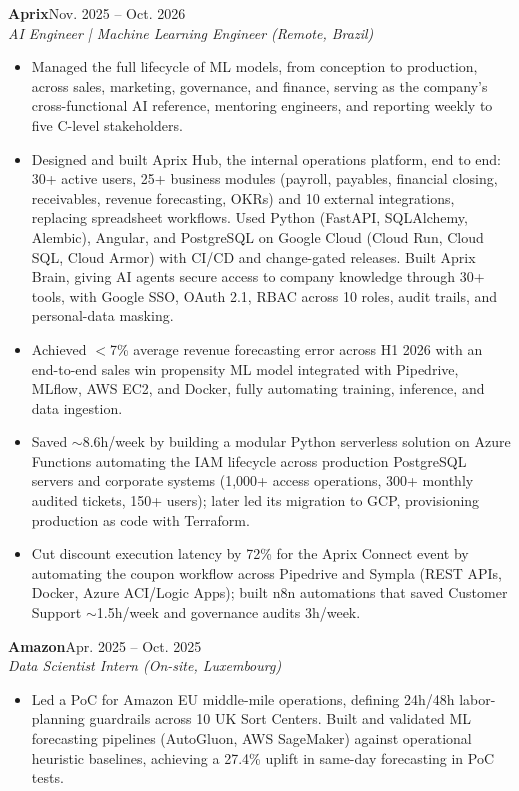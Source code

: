 \documentclass[10pt,letterpaper]{article}
\newcommand{\entry}[4]{%
  \textbf{#1}\hfill #2\\[-1pt]
  \textit{#3}\hfill #4\par\vspace{1pt}}
\newenvironment{bul}{\begin{itemize}[leftmargin=1.5em,label=--,itemsep=0pt,topsep=1pt,parsep=0pt]}{\end{itemize}}
\begin{document}
\entry{Aprix}{Nov. 2025 -- Oct. 2026}{AI Engineer | Machine Learning Engineer (Remote, Brazil)}{}
\begin{bul}
\item Managed the full lifecycle of ML models, from conception to production, across sales, marketing, governance, and finance, serving as the company's cross-functional AI reference, mentoring engineers, and reporting weekly to five C-level stakeholders.
\item Designed and built Aprix Hub, the internal operations platform, end to end: 30+ active users, 25+ business modules (payroll, payables, financial closing, receivables, revenue forecasting, OKRs) and 10 external integrations, replacing spreadsheet workflows. Used Python (FastAPI, SQLAlchemy, Alembic), Angular, and PostgreSQL on Google Cloud (Cloud Run, Cloud SQL, Cloud Armor) with CI/CD and change-gated releases. Built Aprix Brain, giving AI agents secure access to company knowledge through 30+ tools, with Google SSO, OAuth 2.1, RBAC across 10 roles, audit trails, and personal-data masking.
\item Achieved $<$7\% average revenue forecasting error across H1 2026 with an end-to-end sales win propensity ML model integrated with Pipedrive, MLflow, AWS EC2, and Docker, fully automating training, inference, and data ingestion.
\item Saved $\sim$8.6h/week by building a modular Python serverless solution on Azure Functions automating the IAM lifecycle across production PostgreSQL servers and corporate systems (1,000+ access operations, 300+ monthly audited tickets, 150+ users); later led its migration to GCP, provisioning production as code with Terraform.
\item Cut discount execution latency by 72\% for the Aprix Connect event by automating the coupon workflow across Pipedrive and Sympla (REST APIs, Docker, Azure ACI/Logic Apps); built n8n automations that saved Customer Support $\sim$1.5h/week and governance audits 3h/week.
\end{bul}

\entry{Amazon}{Apr. 2025 -- Oct. 2025}{Data Scientist Intern (On-site, Luxembourg)}{}
\begin{bul}
\item Led a PoC for Amazon EU middle-mile operations, defining 24h/48h labor-planning guardrails across 10 UK Sort Centers. Built and validated ML forecasting pipelines (AutoGluon, AWS SageMaker) against operational heuristic baselines, achieving a 27.4\% uplift in same-day forecasting in PoC tests.
\end{bul}
\end{document}
